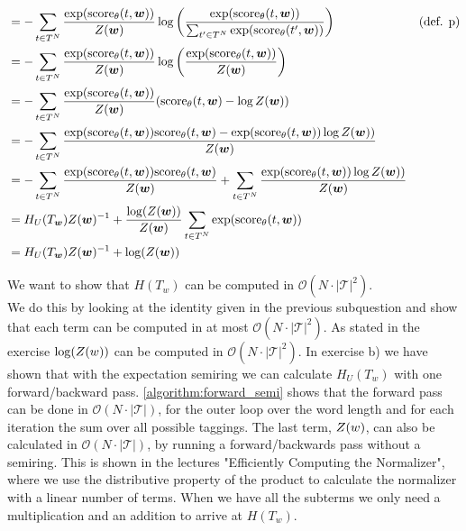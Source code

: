\documentclass[a4paper,12pt]{ETHexercise}
\begin{document}
\begin{question}
\begin{subquestion}
\begin{align}
			       & = -\sum_{t \in T^{N}} \frac{\exp(\text{score}_{\theta}(t, \boldsymbol{w}))}{Z(\boldsymbol{w})} \log \left( \frac{\exp(\text{score}_{\theta}(t, \boldsymbol{w}))}{\sum_{t' \in T^N} \exp(\text{score}_{\theta}(t', \boldsymbol{w}))} \right)                   &  & \text{(def. p)} \\
			       & = -\sum_{t \in T^{N}} \frac{\exp(\text{score}_{\theta}(t, \boldsymbol{w}))}{Z(\boldsymbol{w})} \log \left( \frac{\exp(\text{score}_{\theta}(t, \boldsymbol{w}))}{Z(\boldsymbol{w})} \right)                                                          \\
			       & = -\sum_{t \in T^{N}} \frac{\exp(\text{score}_{\theta}(t, \boldsymbol{w}))}{Z(\boldsymbol{w})} (\text{score}_{\theta}(t, \boldsymbol{w}) - \log Z(\boldsymbol{w}))                                                                                   \\
			       & = -\sum_{t \in T^{N}} \frac{\exp(\text{score}_{\theta}(t, \boldsymbol{w})) \text{score}_{\theta}(t, \boldsymbol{w}) - \exp(\text{score}_{\theta}(t, \boldsymbol{w})) \log Z(\boldsymbol{w}))}{Z(\boldsymbol{w})}                                                                   \\
			       & = -\sum_{t \in T^{N}} \frac{\exp(\text{score}_{\theta}(t, \boldsymbol{w})) \text{score}_{\theta}(t, \boldsymbol{w})}{Z(\boldsymbol{w})} + \sum_{t \in T^{N}} \frac{\exp(\text{score}_{\theta}(t, \boldsymbol{w})) \log Z(\boldsymbol{w}))}{Z(\boldsymbol{w})}                      \\
			       & = H_U(T_{\boldsymbol{w}}) Z(\boldsymbol{w})^{-1}  + \frac{\log(Z(\boldsymbol{w}))}{Z(\boldsymbol{w})} \sum_{t \in T^{N}} \exp(\text{score}_{\theta}(t, \boldsymbol{w}))                                                \\
			       & = H_U(T_{\boldsymbol{w}}) Z(\boldsymbol{w})^{-1}  + \log(Z(\boldsymbol{w}))                                                                                                              \\
		\end{align}
	\end{subquestion}
	\begin{subquestion}
		We want to show that $H(T_w)$ can be computed in $\mathcal{O}(N \cdot |\mathcal{T}|^2)$.\\
		We do this by looking at the identity given in the previous subquestion and show that each term can be computed in at most $\mathcal{O}(N \cdot |\mathcal{T}|^2)$. As stated in the exercise $\log(Z(\boldmath{w}))$ can be computed in $\mathcal{O}(N \cdot |\mathcal{T}|^2)$. In exercise b) we have shown that with the expectation semiring we can calculate $H_U(T_w)$ with one forward/backward pass. \cref{algorithm:forward_semi} shows that the forward pass can be done in $\mathcal{O}(N \cdot |\mathcal{T}|)$, for the outer loop over the word length and for each iteration the sum over all possible taggings. The last term, $Z(\boldmath{w})$, can also be calculated in $\mathcal{O}(N \cdot |\mathcal{T}|)$, by running a forward/backwards pass without a semiring. This is shown in the lectures "Efficiently Computing the Normalizer", where we use  the distributive property of the product to calculate the normalizer with a linear number of terms. When we have all the subterms we only need a multiplication and an addition to arrive at $H(T_w)$.\\\\

\end{subquestion}
\end{question}
\end{document}
